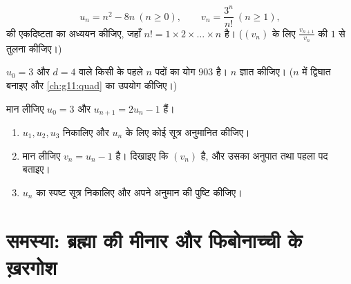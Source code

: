 \begin{exercise}[$\star\star$]\label{exo:g11:seq:9}
\[
u_n = n^2 - 8n \ (n \geq 0), \qquad
v_n = \frac{3^n}{n!}\ (n \geq 1),
\]
की एकदिष्टता का अध्ययन कीजिए, जहाँ $n! = 1 \times 2 \times \dots \times n$ है। ($(v_n)$ के लिए $\frac{v_{n+1}}{v_n}$ की $1$
से तुलना कीजिए।)
\end{exercise}

\begin{exercise}[$\star\star$]\label{exo:g11:seq:10}
$u_0 = 3$ और $d = 4$ वाले किसी  के पहले $n$ पदों का योग $903$ है।
$n$ ज्ञात कीजिए। ($n$ में द्विघात  बनाइए और \cref{ch:g11:quad} का उपयोग कीजिए।)
\end{exercise}

\begin{exercise}[$\star\star\star$]\label{exo:g11:seq:11}
मान लीजिए $u_0 = 3$ और $u_{n+1} = 2u_n - 1$ हैं।
\begin{enumerate}
  \item $u_1, u_2, u_3$ निकालिए और $u_n$ के लिए कोई सूत्र अनुमानित कीजिए।
  \item मान लीजिए $v_n = u_n - 1$ है। दिखाइए कि $(v_n)$  है, और उसका अनुपात
        तथा पहला पद बताइए।
  \item $u_n$ का स्पष्ट सूत्र निकालिए और अपने अनुमान की पुष्टि कीजिए।
\end{enumerate}
\end{exercise}

\section{समस्या: ब्रह्मा की मीनार और फिबोनाच्ची के ख़रगोश}

